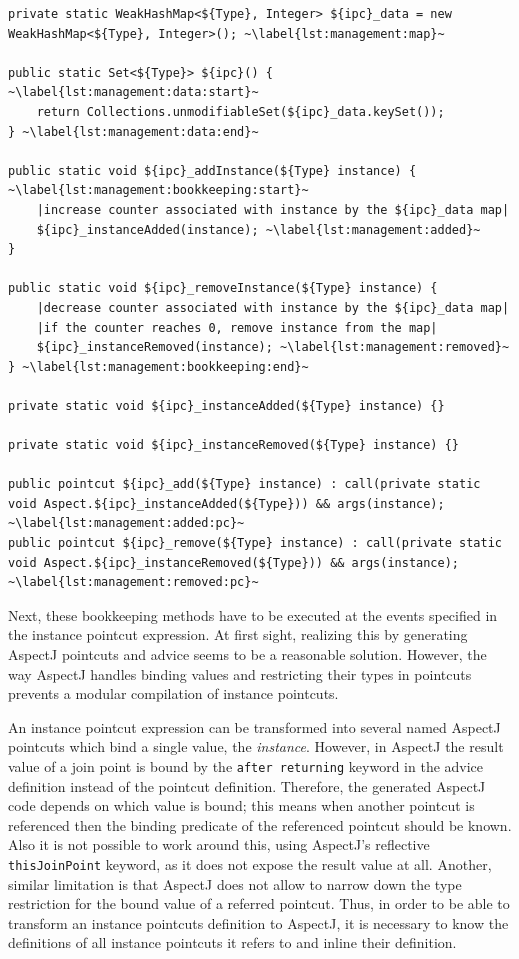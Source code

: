 \documentclass{acm_proc_article-sp}
\begin{document}
\begin{lstlisting}[float, caption={Template of generated code for instance set management.},label=lst:management]
private static WeakHashMap<${Type}, Integer> ${ipc}_data = new WeakHashMap<${Type}, Integer>(); ~\label{lst:management:map}~

public static Set<${Type}> ${ipc}() { ~\label{lst:management:data:start}~
	return Collections.unmodifiableSet(${ipc}_data.keySet());
} ~\label{lst:management:data:end}~

public static void ${ipc}_addInstance(${Type} instance) { ~\label{lst:management:bookkeeping:start}~
	|increase counter associated with instance by the ${ipc}_data map|
	${ipc}_instanceAdded(instance); ~\label{lst:management:added}~
}

public static void ${ipc}_removeInstance(${Type} instance) {
	|decrease counter associated with instance by the ${ipc}_data map|
	|if the counter reaches 0, remove instance from the map|
	${ipc}_instanceRemoved(instance); ~\label{lst:management:removed}~
} ~\label{lst:management:bookkeeping:end}~

private static void ${ipc}_instanceAdded(${Type} instance) {}

private static void ${ipc}_instanceRemoved(${Type} instance) {}

public pointcut ${ipc}_add(${Type} instance) : call(private static void Aspect.${ipc}_instanceAdded(${Type})) && args(instance); ~\label{lst:management:added:pc}~
public pointcut ${ipc}_remove(${Type} instance) : call(private static void Aspect.${ipc}_instanceRemoved(${Type})) && args(instance); ~\label{lst:management:removed:pc}~
\end{lstlisting}

Next, these bookkeeping methods have to be executed at the events specified in the instance pointcut expression.
At first sight, realizing this by generating AspectJ pointcuts and advice seems to be a reasonable solution.
However, the way AspectJ handles binding values and restricting their types in pointcuts prevents a modular compilation of instance pointcuts.

An instance pointcut expression can be transformed into several named AspectJ pointcuts which bind a single value, the \emph{instance}.
However, in AspectJ the result value of a join point is bound by the \lstinline{after returning} keyword in the advice definition instead of the pointcut definition.
Therefore, the generated AspectJ code depends on which value is bound; this means when another pointcut is referenced then the binding predicate of the referenced pointcut should be known.
Also it is not possible to work around this, using AspectJ's reflective \lstinline{thisJoinPoint} keyword, as it does not expose the result value at all.
Another, similar limitation is that AspectJ does not allow to narrow down the type restriction for the bound value of a referred pointcut.
Thus, in order to be able to transform an instance pointcuts definition to AspectJ, it is necessary to know the definitions of all instance pointcuts it refers to and inline their definition.
\end{document}
